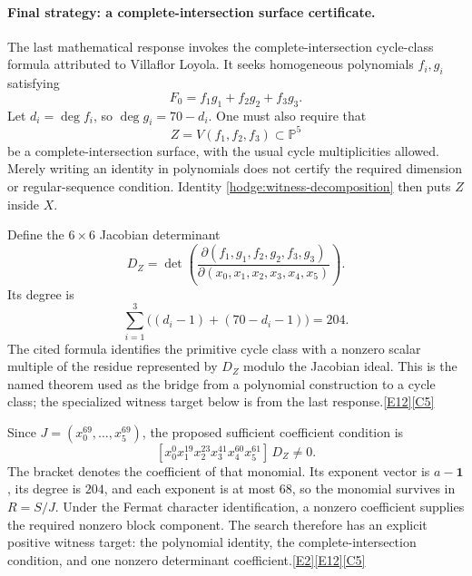 \documentclass[11pt]{article}
\newcommand{\src}[1]{\hyperlink{src:#1}{[#1]}}
\begin{document}
\paragraph{Final strategy: a complete-intersection surface certificate.}
The last mathematical response invokes the complete-intersection cycle-class
formula attributed to Villaflor Loyola. It seeks homogeneous polynomials
$f_i,g_i$ satisfying
\begin{equation}\label{hodge:witness-decomposition}
 \boxed{\qquad F_0=f_1g_1+f_2g_2+f_3g_3.\qquad}
\end{equation}
Let $d_i=\deg f_i$, so $\deg g_i=70-d_i$. One must also require that
\[
 Z=V(f_1,f_2,f_3)\subset\mathbb P^5
\]
be a complete-intersection surface, with the usual cycle multiplicities
allowed. Merely writing an identity in polynomials does not certify the
required dimension or regular-sequence condition. Identity
\eqref{hodge:witness-decomposition} then puts $Z$ inside $X$.

Define the $6\times6$ Jacobian determinant
\begin{equation}\label{hodge:witness-determinant}
 D_Z=\det\left(
 \frac{\partial(f_1,g_1,f_2,g_2,f_3,g_3)}
      {\partial(x_0,x_1,x_2,x_3,x_4,x_5)}\right).
\end{equation}
Its degree is
\[
 \sum_{i=1}^{3}\bigl((d_i-1)+(70-d_i-1)\bigr)=204.
\]
The cited formula identifies the primitive cycle class with a nonzero scalar
multiple of the residue represented by $D_Z$ modulo the Jacobian ideal.
This is the named theorem used as the bridge from a polynomial construction
to a cycle class; the specialized witness target below is from the last
response.\src{E12}\src{C5}

Since $J=(x_0^{69},\ldots,x_5^{69})$, the proposed sufficient coefficient
condition is
\begin{equation}\label{hodge:witness-coefficient}
 \boxed{\quad
 [x_0^0x_1^{19}x_2^{23}x_3^{41}x_4^{60}x_5^{61}]\,D_Z\ne0.
 \quad}
\end{equation}
The bracket denotes the coefficient of that monomial. Its exponent vector
is $a-\mathbf1$, its degree is $204$, and each exponent is at most $68$,
so the monomial survives in $R=S/J$. Under the Fermat character
identification, a nonzero coefficient supplies the required nonzero block
component. The search therefore has an explicit positive witness target:
the polynomial identity, the complete-intersection condition, and one
nonzero determinant coefficient.\src{E2}\src{E12}\src{C5}
\end{document}
